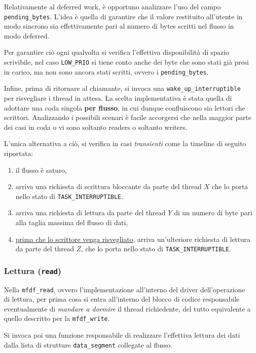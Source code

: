 \documentclass{article}
\begin{document}
Relativamente al deferred work, è opportuno analizzare l'uso del campo \texttt{pending\_bytes}. L'idea è quella di garantire che il valore restituito all'utente in modo sincrono sia effettivamente pari al numero di bytes scritti nel flusso in modo deferred.

Per garantire ciò ogni qualvolta si verifica l'effettiva disponibilità di spazio scrivibile, nel caso \texttt{LOW\_PRIO} si tiene conto anche dei byte che sono stati già presi in carico, ma non sono ancora stati scritti, ovvero i \texttt{pending\_bytes}.

Infine, prima di ritornare al chiamante, si invoca una \texttt{wake\_up\_interruptible} per risvegliare i thread in attesa. La scelta implementativa è stata quella di adottare una coda singola \textbf{per flusso}, in cui dunque confluiscono sia lettori che scrittori. Analizzando i possibili scenari è facile accorgersi che nella maggior parte dei casi in coda o vi sono soltanto readers o soltanto writers.

L'unica alternativa a ciò, si verifica in casi \textit{transienti} come la timeline di seguito riportata:
\begin{enumerate}
        \item il flusso è saturo,
        \item arriva una richiesta di scrittura bloccante da parte del thread $X$ che lo porta nello stato di \texttt{TASK\_INTERRUPTIBLE},
        \item arriva una richiesta di lettura da parte del thread $Y$ di un numero di byte pari alla taglia massima del flusso di dati,
        \item \ul{prima che lo scrittore venga risvegliato}, arriva un'ulteriore richiesta di lettura da parte del thread $Z$, che lo porta nello stato di \texttt{TASK\_INTERRUPTIBLE}.
\end{enumerate}

\subsubsection{Lettura (\texttt{read})}
Nella \texttt{mfdf\_read}, ovvero l'implementazione all'interno del driver dell'operazione di lettura, per prima cosa si entra all'interno del blocco di codice responsabile eventualmente di \textit{mandare a dormire} il thread richiedente, del tutto equivalente a quello descritto per la \texttt{mfdf\_write}.

Si invoca poi una funzione responsabile di realizzare l'effettiva lettura dei dati dalla lista di strutture \texttt{data\_segment} collegate al flusso.
\end{document}
